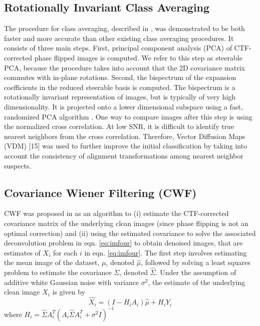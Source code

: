 \documentclass{article}
\begin{document}
\subsection{Rotationally Invariant Class Averaging}
The procedure for class averaging, described in \cite{zhao}, was demonstrated to be both faster and more accurate than other existing class averaging procedures. It consists of three main steps. First, principal component analysis (PCA) of CTF-corrected phase flipped images is computed. We refer to this step as steerable PCA, because the procedure takes into account that the 2D covariance matrix commutes with in-plane rotations. Second, the bispectrum of the expansion coefficients in the reduced steerable basis is computed. The bispectrum is a rotationally invariant representation of images, but is typically of very high dimensionality. It is projected onto a lower dimensional subspace using a fast, randomized PCA algorithm \cite{rokhlin}. One way to compare images after this step is using the normalized cross correlation. At low SNR, it is difficult to identify true nearest neighbors from the cross correlation. Therefore, Vector Diffusion Maps (VDM) [15] was used to further improve the initial classification by taking into account the consistency of alignment transformations among nearest neighbor suspects. 
\vspace*{-\baselineskip}

\subsection{Covariance Wiener Filtering (CWF)}
CWF was proposed in \cite{cwf} as an algorithm to (i) estimate the CTF-corrected covariance matrix of the underlying clean images (since phase flipping is not an optimal correction)  and (ii) using the estimated covariance to solve the associated deconvolution problem in eqn. \ref{eq:imfour} to obtain denoised images, that are estimates of $X_i$ for each $i$ in 
eqn. \ref{eq:imfour}. The first step involves estimating the mean image of the dataset, $\mu$, denoted $\hat{\mu}$, followed by solving a least squares problem to estimate the covariance $\Sigma$, denoted $\hat{\Sigma}$. Under the assumption of additive white Gaussian noise with variance $\sigma^2$, the estimate of the underlying clean image $X_i$ is given by
\begin{equation}
\hat{X_i}=(I-H_iA_i)\hat{\mu} + H_iY_i
\end{equation}
where $H_i=\hat{\Sigma}A_i^T(A_i \hat{\Sigma}A_i^T + \sigma^2 I)^{-1}$
%
\end{document}
